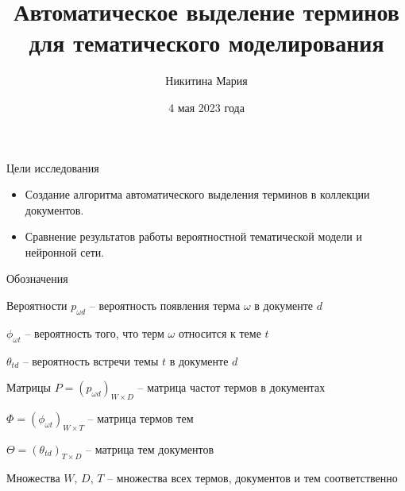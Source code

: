 \documentclass{beamer}
\begin{document}
\title{Автоматическое выделение терминов для тематического моделирования}  
\author{Никитина Мария}
\date{4 мая 2023 года} 
\frame{\titlepage} 

\begin{frame}{Цели исследования}
\begin{itemize}
    \item Создание алгоритма автоматического выделения терминов в коллекции документов.
    \item Сравнение результатов работы вероятностной тематической модели и нейронной сети.
\end{itemize}
\end{frame}

\begin{frame}{Обозначения}
\begin{block}{Вероятности}
$p_{\omega d}$ -- вероятность появления терма $\omega$ в документе $d$

$\phi_{\omega t}$ -- вероятность того, что терм $\omega$ относится к теме $t$

$\theta_{td}$ -- вероятность встречи темы $t$ в документе $d$
\end{block}

\begin{block}{Матрицы}
$P = (p_{\omega d})_{W \times D}$ -- матрица частот термов в документах

$\Phi = (\phi_{\omega t})_{W \times T}$ -- матрица термов тем

$\Theta = (\theta_{td})_{T \times D}$ -- матрица тем документов
\end{block}

\begin{block}{Множества}
$W$, $D$, $T$ -- множества всех термов, документов и тем соответственно
\end{block}
\end{frame}
\end{document}
